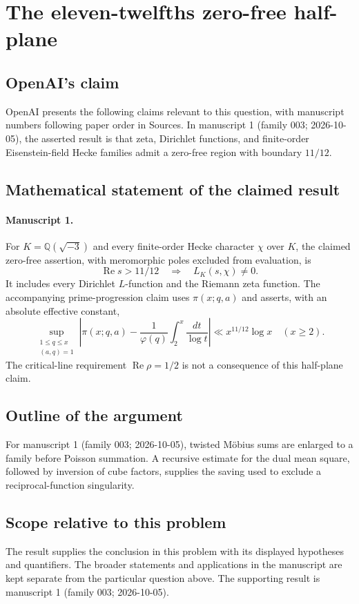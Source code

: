 \documentclass[11pt]{article}
\begin{document}
\section*{The eleven-twelfths zero-free half-plane}

\subsection{OpenAI's claim}
OpenAI presents the following claims relevant to this question, with manuscript numbers following paper order in Sources. In manuscript 1 (family 003; 2026-10-05), the asserted result is that zeta, Dirichlet functions, and finite-order Eisenstein-field Hecke families admit a zero-free region with boundary $11/12$.

\subsection{Mathematical statement of the claimed result}
\paragraph{Manuscript 1.}
For $K=\mathbb Q(\sqrt{-3})$ and every finite-order Hecke character $\chi$ over $K$, the claimed zero-free assertion, with meromorphic poles excluded from evaluation, is
\[
 \operatorname{Re}s>11/12\quad\Longrightarrow\quad L_K(s,\chi)\ne0.
\]
It includes every Dirichlet $L$-function and the Riemann zeta function. The accompanying prime-progression claim uses $\pi(x;q,a)$ and asserts, with an absolute effective constant,
\[
 \sup_{\substack{1\le q\le x\\(a,q)=1}}
 \left|\pi(x;q,a)-\frac1{\varphi(q)}\int_2^x\frac{dt}{\log t}\right|
 \ll x^{11/12}\log x\quad(x\ge2).
\]
The critical-line requirement $\operatorname{Re}\rho=1/2$ is not a consequence of this half-plane claim.

\subsection{Outline of the argument}
For manuscript 1 (family 003; 2026-10-05), twisted M\"obius sums are enlarged to a family before Poisson summation. A recursive estimate for the dual mean square, followed by inversion of cube factors, supplies the saving used to exclude a reciprocal-function singularity.

\subsection{Scope relative to this problem}
The result supplies the conclusion in this problem with its displayed hypotheses and quantifiers. The broader statements and applications in the manuscript are kept separate from the particular question above. The supporting result is manuscript 1 (family 003; 2026-10-05).
\end{document}
